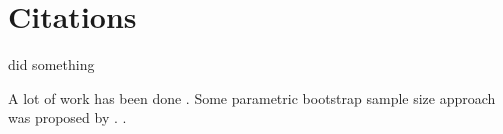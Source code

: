 \documentclass[12pt]{article}
\begin{document}
\lipsum[2]

\section{Citations}
\label{sec:cite}

\citet{ananth1997regression} did something 
\lipsum[1]

A lot of work has been done \citep[e.g.,][]{ananth1997regression}.
\lipsum[2]
Some parametric bootstrap sample size approach was proposed by
\citet{hu2023hierarchical}. 
\citep{poole1971assumptions}.



\end{document}
